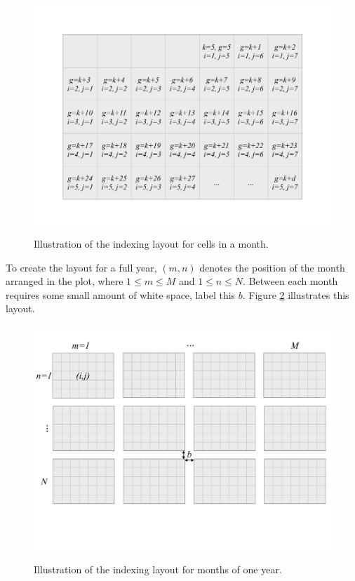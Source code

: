 \documentclass[article]{jss}
\theoremstyle{definition}
\theoremstyle{definition}
\theoremstyle{remark}
\begin{document}
\begin{CodeChunk}
\begin{figure}

{\centering \includegraphics[width=360pt,height=250pt]{figure/month} 

}

\caption[Illustration of the indexing layout for cells in
a month.]{Illustration of the indexing layout for cells in
a month.}\label{fig:month-diagram}
\end{figure}
\end{CodeChunk}




To create the layout for a full year, \((m, n)\) denotes the position of
the month arranged in the plot, where \(1 \le m \le M\) and
\(1 \le n \le N\). Between each month requires some small amount of
white space, label this \(b\). Figure \ref{fig:year-diagram} illustrates
this layout.

\begin{CodeChunk}
\begin{figure}

{\centering \includegraphics[width=360pt,height=250pt]{figure/year} 

}

\caption[Illustration of the indexing layout for months of
one year.]{Illustration of the indexing layout for months of
one year.}\label{fig:year-diagram}
\end{figure}
\end{CodeChunk}
\end{document}
